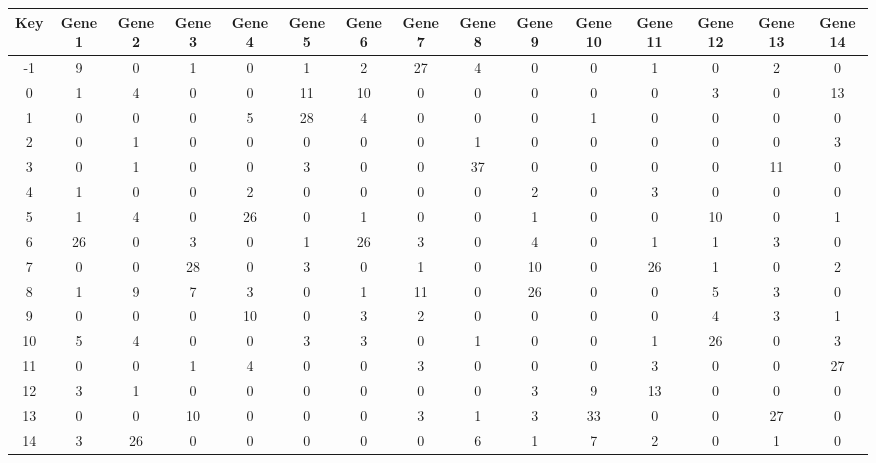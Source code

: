 \begin{tabular}{|c|c|c|c|c|c|c|c|c|c|c|c|c|c|c|}
\hline
Key & Gene 1 & Gene 2 & Gene 3 & Gene 4 & Gene 5 & Gene 6 & Gene 7 & Gene 8 & Gene 9 & Gene 10 & Gene 11 & Gene 12 & Gene 13 & Gene 14 \\
\hline
-1 & 9 & 0 & 1 & 0 & 1 & 2 & 27 & 4 & 0 & 0 & 1 & 0 & 2 & 0 \\
0 & 1 & 4 & 0 & 0 & 11 & 10 & 0 & 0 & 0 & 0 & 0 & 3 & 0 & 13 \\
1 & 0 & 0 & 0 & 5 & 28 & 4 & 0 & 0 & 0 & 1 & 0 & 0 & 0 & 0 \\
2 & 0 & 1 & 0 & 0 & 0 & 0 & 0 & 1 & 0 & 0 & 0 & 0 & 0 & 3 \\
3 & 0 & 1 & 0 & 0 & 3 & 0 & 0 & 37 & 0 & 0 & 0 & 0 & 11 & 0 \\
4 & 1 & 0 & 0 & 2 & 0 & 0 & 0 & 0 & 2 & 0 & 3 & 0 & 0 & 0 \\
5 & 1 & 4 & 0 & 26 & 0 & 1 & 0 & 0 & 1 & 0 & 0 & 10 & 0 & 1 \\
6 & 26 & 0 & 3 & 0 & 1 & 26 & 3 & 0 & 4 & 0 & 1 & 1 & 3 & 0 \\
7 & 0 & 0 & 28 & 0 & 3 & 0 & 1 & 0 & 10 & 0 & 26 & 1 & 0 & 2 \\
8 & 1 & 9 & 7 & 3 & 0 & 1 & 11 & 0 & 26 & 0 & 0 & 5 & 3 & 0 \\
9 & 0 & 0 & 0 & 10 & 0 & 3 & 2 & 0 & 0 & 0 & 0 & 4 & 3 & 1 \\
10 & 5 & 4 & 0 & 0 & 3 & 3 & 0 & 1 & 0 & 0 & 1 & 26 & 0 & 3 \\
11 & 0 & 0 & 1 & 4 & 0 & 0 & 3 & 0 & 0 & 0 & 3 & 0 & 0 & 27 \\
12 & 3 & 1 & 0 & 0 & 0 & 0 & 0 & 0 & 3 & 9 & 13 & 0 & 0 & 0 \\
13 & 0 & 0 & 10 & 0 & 0 & 0 & 3 & 1 & 3 & 33 & 0 & 0 & 27 & 0 \\
14 & 3 & 26 & 0 & 0 & 0 & 0 & 0 & 6 & 1 & 7 & 2 & 0 & 1 & 0 \\
\hline
\end{tabular}